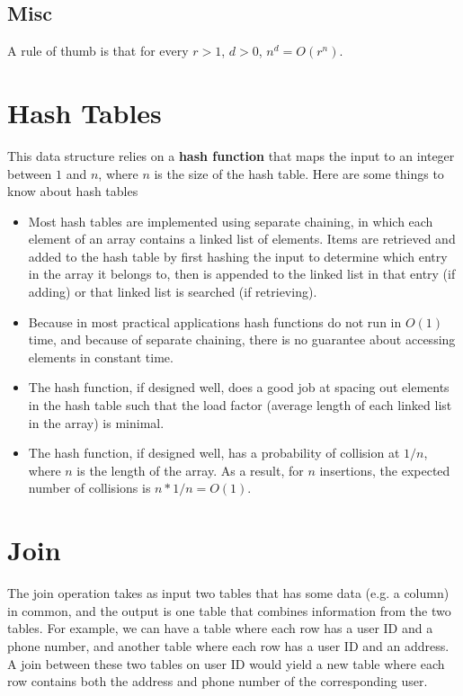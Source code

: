 \subsection{Misc}
A rule of thumb is that for every $r > 1$, $d > 0$, $n^d = O(r^n)$.

\section{Hash Tables}
This data structure relies on a \textbf{hash function} that maps the input to an integer between $1$ and $n$, where $n$ is the size of the hash table. Here are some things to know about hash tables
\begin{itemize}
  \item Most hash tables are implemented using separate chaining, in which each element of an array contains a linked list of elements. Items are retrieved and added to the hash table by first hashing the input to determine which entry in the array it belongs to, then is appended to the linked list in that entry (if adding) or that linked list is searched (if retrieving).
  \item Because in most practical applications hash functions do not run in $O(1)$ time, and because of separate chaining, there is no guarantee about accessing elements in constant time.
  \item The hash function, if designed well, does a good job at spacing out elements in the hash table such that the load factor (average length of each linked list in the array) is minimal.
  \item The hash function, if designed well, has a probability of collision at $1/n$, where $n$ is the length of the array. As a result, for $n$ insertions, the expected number of collisions is $n * 1/n = O(1)$.
\end{itemize}

\section{Join}
The join operation takes as input two tables that has some data (e.g. a column) in common, and the output is one table that combines information from the two tables. For example, we can have a table where each row has a user ID and a phone number, and another table where each row has a user ID and an address. A join between these two tables on user ID would yield a new table where each row contains both the address and phone number of the corresponding user.

